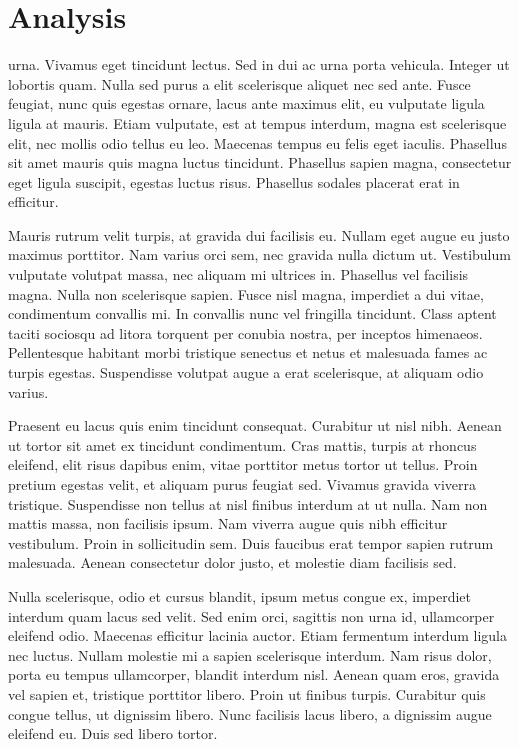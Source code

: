 \documentclass[aps,11pt, twocolumn]{revtex4-1}
\begin{document}
\section{Analysis} urna. Vivamus eget tincidunt lectus. Sed in dui ac urna porta vehicula. Integer ut lobortis quam. Nulla sed purus a elit scelerisque aliquet nec sed ante. Fusce feugiat, nunc quis egestas ornare, lacus ante maximus elit, eu vulputate ligula ligula at mauris. Etiam vulputate, est at tempus interdum, magna est scelerisque elit, nec mollis odio tellus eu leo. Maecenas tempus eu felis eget iaculis. Phasellus sit amet mauris quis magna luctus tincidunt. Phasellus sapien magna, consectetur eget ligula suscipit, egestas luctus risus. Phasellus sodales placerat erat in efficitur.

Mauris rutrum velit turpis, at gravida dui facilisis eu. Nullam eget augue eu justo maximus porttitor. Nam varius orci sem, nec gravida nulla dictum ut. Vestibulum vulputate volutpat massa, nec aliquam mi ultrices in. Phasellus vel facilisis magna. Nulla non scelerisque sapien. Fusce nisl magna, imperdiet a dui vitae, condimentum convallis mi. In convallis nunc vel fringilla tincidunt. Class aptent taciti sociosqu ad litora torquent per conubia nostra, per inceptos himenaeos. Pellentesque habitant morbi tristique senectus et netus et malesuada fames ac turpis egestas. Suspendisse volutpat augue a erat scelerisque, at aliquam odio varius.

Praesent eu lacus quis enim tincidunt consequat. Curabitur ut nisl nibh. Aenean ut tortor sit amet ex tincidunt condimentum. Cras mattis, turpis at rhoncus eleifend, elit risus dapibus enim, vitae porttitor metus tortor ut tellus. Proin pretium egestas velit, et aliquam purus feugiat sed. Vivamus gravida viverra tristique. Suspendisse non tellus at nisl finibus interdum at ut nulla. Nam non mattis massa, non facilisis ipsum. Nam viverra augue quis nibh efficitur vestibulum. Proin in sollicitudin sem. Duis faucibus erat tempor sapien rutrum malesuada. Aenean consectetur dolor justo, et molestie diam facilisis sed.

Nulla scelerisque, odio et cursus blandit, ipsum metus congue ex, imperdiet interdum quam lacus sed velit. Sed enim orci, sagittis non urna id, ullamcorper eleifend odio. Maecenas efficitur lacinia auctor. Etiam fermentum interdum ligula nec luctus. Nullam molestie mi a sapien scelerisque interdum. Nam risus dolor, porta eu tempus ullamcorper, blandit interdum nisl. Aenean quam eros, gravida vel sapien et, tristique porttitor libero. Proin ut finibus turpis. Curabitur quis congue tellus, ut dignissim libero. Nunc facilisis lacus libero, a dignissim augue eleifend eu. Duis sed libero tortor.
\end{document}
